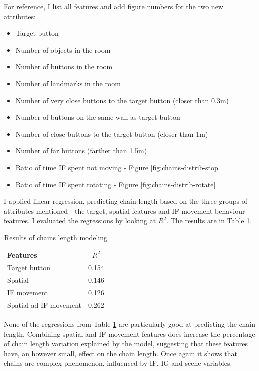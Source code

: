 For reference, I list all features and add figure numbers for the two new attributes:
\begin{itemize}
\item
Target button	
\item
Number of objects in the room
\item
Number of buttons in the room
\item
Number of landmarks in the room
\item
Number of very close buttons to the target button (closer than 0.3m)
\item
Number of buttons on the same wall as target button
\item
Number of close buttons to the target button (closer than 1m)
\item
Number of far buttons (farther than 1.5m)
\item
Ratio of time IF spent not moving - Figure \ref{fig:chains-distrib-stop}
\item
Ratio of time IF spent rotating - Figure \ref{fig:chains-distrib-rotate}
\end{itemize}

I applied linear regression, predicting chain length based on the three groups of attributes mentioned - the target, spatial features and IF movement behaviour features. I evaluated the regressions by looking at $R^2$. The results are in Table \ref{tab:chains-lr-length}.

\begin{table}[!htbp]
 \centering
\begin{tabular}{lc}
\toprule
Features & $R^2$  \\
\midrule
Target button & 0.154\\
Spatial & 0.146 \\
IF movement & 0.126 \\
Spatial ad IF movement & 0.262 \\
\bottomrule
\end{tabular}
\caption{Results of chains length modeling}
\label{tab:chains-lr-length}
\end{table}

None of the regressions from Table \ref{tab:chains-lr-length} are particularly good at predicting the chain length. Combining spatial and IF movement features does increase the percentage of chain length variation explained by the model, suggesting that these features have, an however small, effect on the chain length. Once again it shows that chains are complex phenomenon, influenced by IF, IG and scene variables.

